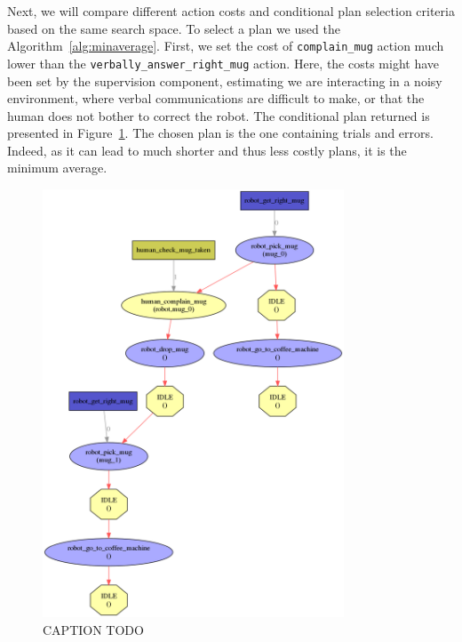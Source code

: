 \documentclass[a4paper,11pt,twoside]{StyleThese}
\begin{document}
Next, we will compare different action costs and conditional plan selection criteria based on the same search space. To select a plan we used the Algorithm~\ref{alg:minaverage}. First, we set the cost of \verb'complain_mug' action much lower than the \verb'verbally_answer_right_mug' action. Here, the costs might have been set by the supervision component, estimating we are interacting in a noisy environment, where verbal communications are difficult to make, or that the human does not bother to correct the robot. The conditional plan returned is presented in Figure~\ref{fig:chap4mugtrialerror}. The chosen plan is the one containing trials and errors. Indeed, as it can lead to much shorter and thus less costly plans, it is the minimum average. 
\begin{figure}[hbtp]
\centering
\includegraphics[width=0.8\textwidth]{figures/chapter4/mug_selection_trials.png}
\caption{CAPTION TODO}
\label{fig:chap4mugtrialerror}
\end{figure}
\end{document}
